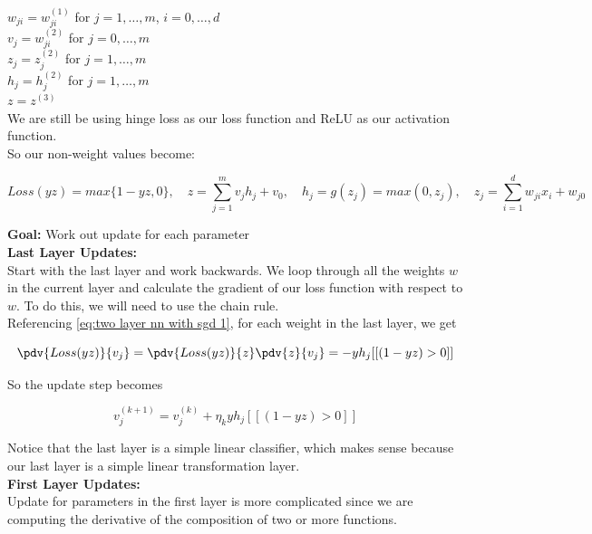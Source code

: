 \documentclass[12pt]{article}
\begin{document}
$w_{ji} = w_{ji}^{(1)}$ for $j= 1, \dots, m$, $i = 0, \dots, d$\\
$v_{j} = w_{ji}^{(2)}$ for $j= 0, \dots, m$\\
$z_{j} = z_{j}^{(2)}$ for $j= 1, \dots, m$\\
$h_{j} = h_{j}^{(2)}$ for $j= 1, \dots, m$\\
$z = z^{(3)}$\\

We are still be using hinge loss as our loss function and ReLU as our activation function.\\

So our non-weight values become:

\begin{equation}
	Loss(yz) = max\{ 1-yz, 0 \}, \quad z = \sum_{j=1}^m v_jh_j + v_0, \quad h_j = g(z_j) = max(0, z_j), \quad z_j = \sum_{i=1}^d w_{ji}x_i + w_{j0}
	\label{eq:two layer nn with sgd 1}
\end{equation}

\textbf{Goal:} Work out update for each parameter\\

\textbf{Last Layer Updates:}\\

Start with the last layer and work backwards. We loop through all the weights $w$ in the current layer and calculate the gradient of our loss function with respect to $w$. To do this, we will need to use the chain rule.\\

Referencing \ref{eq:two layer nn with sgd 1}, for each weight in the last layer, we get

\[ \pdv{Loss(yz)}{v_j} = \pdv{Loss(yz)}{z} \pdv{z}{v_j} = -yh_j[[(1-yz) > 0]] \]

So the update step becomes

\begin{equation}
	v_j^{(k+1)} = v_j^{(k)} + \eta_k yh_j[[(1-yz) > 0]]
	\label{eq:two layer nn with sgd 2}
\end{equation}

Notice that the last layer is a simple linear classifier, which makes sense because our last layer is a simple linear transformation layer.\\

\textbf{First Layer Updates:}\\

Update for parameters in the first layer is more complicated since we are computing the derivative of the composition of two or more functions.\\
\end{document}
